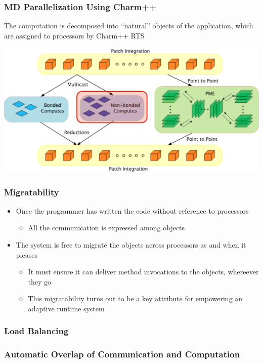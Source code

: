 \begin{frame}[t]
\frametitle{MD Parallelization Using Charm++}
The computation is decomposed into ``natural'' objects of the application, which
are assigned to processors by Charm++ RTS
  \begin{center} \includegraphics[width=\textwidth]{figures/md_parallelize.pdf} \end{center}
\end{frame}

\begin{frame}[t]
\frametitle{Migratability}
  \begin{itemize}
    \item Once the programmer has written the code without reference to processors
      \begin{itemize}
        \item All the communication is expressed among objects
      \end{itemize}
    \item The system is free to migrate the objects across processors as and when it pleases
      \begin{itemize}
        \item It must ensure it can deliver method invocations to the objects, whereever they go
        \item This migratability turns out to be a key attribute for empowering an adaptive runtime system
      \end{itemize}
  \end{itemize}
\end{frame}

\begin{frame}[t]
  \frametitle{Load Balancing}
\end{frame}

\begin{frame}[t]
  \frametitle{Automatic Overlap of Communication and Computation}
\end{frame}

